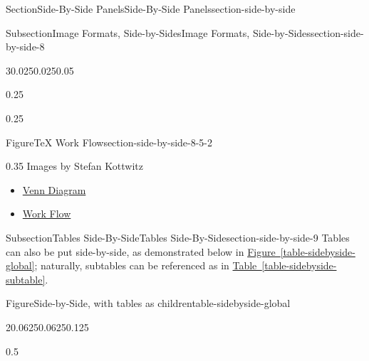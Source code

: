 \documentclass[twoside,10pt,]{article}
\newcommand{\xreffont}{\relax}
\numberwithin{equation}{section}
\begin{document}
\begin{sectionptx}{Section}{Side-By-Side Panels}{}{Side-By-Side Panels}{}{}{section-side-by-side}
\begin{subsectionptx}{Subsection}{Image Formats, Side-by-Sides}{}{Image Formats, Side-by-Sides}{}{}{section-side-by-side-8}
\begin{sidebyside}{3}{0.025}{0.025}{0.05}
\begin{sbspanel}{0.25}
{%
}%
\end{sbspanel}%
\begin{sbspanel}{0.25}%
\begin{panelfigureptx}{Figure}{\TeX{} Work Flow}{section-side-by-side-8-5-2}{}%
\noindent{}%
\tcblower
\end{panelfigureptx}%
\end{sbspanel}%
\begin{sbspanel}{0.35}%
Images by Stefan Kottwitz%
\begin{itemize}[label=\textbullet]
\item{}\href{http://www.texample.net/tikz/examples/venn/}{Venn Diagram}\footnotemark{}%
\item{}\href{http://www.texample.net/tikz/examples/smart-circle/}{Work Flow}\footnotemark{}%
\end{itemize}
%
\end{sbspanel}%
\end{sidebyside}%
%
%
\end{subsectionptx}
%
%
\typeout{************************************************}
\typeout{************************************************}
%
\begin{subsectionptx}{Subsection}{Tables Side-By-Side}{}{Tables Side-By-Side}{}{}{section-side-by-side-9}
Tables can also be put side-by-side, as demonstrated below in \hyperref[table-sidebyside-global]{Figure~{\xreffont\ref{table-sidebyside-global}}}; naturally, subtables can be referenced as in \hyperref[table-sidebyside-subtable]{Table~{\xreffont\ref{table-sidebyside-subtable}}}.%
\begin{figureptx}{Figure}{Side-by-Side, with tables as children}{table-sidebyside-global}{}%
\begin{sidebyside}{2}{0.0625}{0.0625}{0.125}%
\begin{sbspanel}{0.5}%

\end{sbspanel}
\end{sidebyside}
\end{figureptx}
\end{subsectionptx}
\end{sectionptx}
\end{document}
